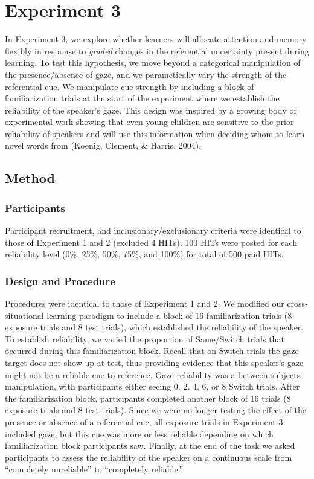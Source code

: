 \documentclass[authoryear, review]{elsarticle}
\begin{document}
\section{Experiment 3}\label{experiment-3}

In Experiment 3, we explore whether learners will allocate attention and
memory flexibly in response to \emph{graded} changes in the referential
uncertainty present during learning. To test this hypothesis, we move
beyond a categorical manipulation of the presence/absence of gaze, and
we parametically vary the strength of the referential cue. We manipulate
cue strength by including a block of familiarization trials at the start
of the experiment where we establish the reliability of the speaker's
gaze. This design was inspired by a growing body of experimental work
showing that even young children are sensitive to the prior reliability
of speakers and will use this information when deciding whom to learn
novel words from (Koenig, Clement, \& Harris, 2004).

\subsection{Method}\label{method-2}

\subsubsection{Participants}\label{participants-2}

Participant recruitment, and inclusionary/exclusionary criteria were
identical to those of Experiment 1 and 2 (excluded 4 HITs). 100 HITs
were posted for each reliability level (0\%, 25\%, 50\%, 75\%, and
100\%) for total of 500 paid HITs.

\subsubsection{Design and Procedure}\label{design-and-procedure-2}

Procedures were identical to those of Experiment 1 and 2. We modified
our cross-situational learning paradigm to include a block of 16
familiarization trials (8 exposure trials and 8 test trials), which
established the reliability of the speaker. To establish reliability, we
varied the proportion of Same/Switch trials that occurred during this
familiarization block. Recall that on Switch trials the gaze target does
not show up at test, thus providing evidence that this speaker's gaze
might not be a reliable cue to reference. Gaze reliability was a
between-subjects manipulation, with participants either seeing 0, 2, 4,
6, or 8 Switch trials. After the familiarization block, participants
completed another block of 16 trials (8 exposure trials and 8 test
trials). Since we were no longer testing the effect of the presence or
absence of a referential cue, all exposure trials in Experiment 3
included gaze, but this cue was more or less reliable depending on which
familiarization block participants saw. Finally, at the end of the task
we asked participants to assess the reliability of the speaker on a
continuous scale from ``completely unreliable'' to ``completely
reliable.''
\end{document}
